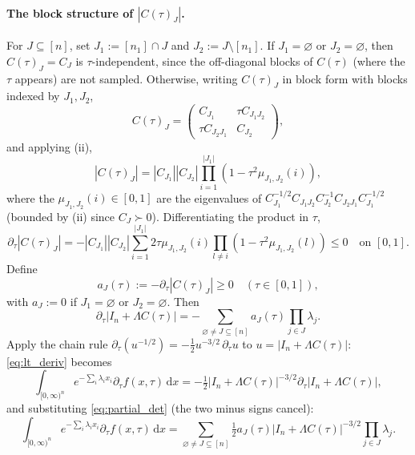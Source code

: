 \documentclass[14pt]{extarticle}
\theoremstyle{definition}
\newcommand{\dd}{\mathrm{d}}
\begin{document}
\paragraph{The block structure of $|C(\tau)_J|$.}  For $J\subseteq[n]$, set
$J_1:=[n_1]\cap J$ and $J_2:=J\setminus[n_1]$.  If $J_1=\varnothing$
or $J_2=\varnothing$, then $C(\tau)_J=C_J$ is $\tau$-independent,
since the off-diagonal blocks of $C(\tau)$ (where the $\tau$ appears)
are not sampled.  Otherwise, writing $C(\tau)_J$ in block form with
blocks indexed by $J_1,J_2$,
\[
  C(\tau)_J
  =\begin{pmatrix}C_{J_1}&\tau C_{J_1J_2}\\
    \tau C_{J_2J_1}&C_{J_2}\end{pmatrix},
\]
and applying (ii),
\begin{equation}\label{eq:CtauJ}
  |C(\tau)_J|
  =|C_{J_1}||C_{J_2}|\prod_{i=1}^{|J_1|}(1-\tau^2\mu_{J_1,J_2}(i)),
\end{equation}
where the $\mu_{J_1,J_2}(i)\in[0,1]$ are the eigenvalues of
$C_{J_1}^{-1/2}C_{J_1J_2}C_{J_2}^{-1}C_{J_2J_1}C_{J_1}^{-1/2}$
(bounded by (ii) since $C_J\succ 0$).
Differentiating the product in $\tau$,
\[
  \partial_\tau|C(\tau)_J|
  =-|C_{J_1}||C_{J_2}|\sum_{i=1}^{|J_1|}2\tau\mu_{J_1,J_2}(i)
  \prod_{l\ne i}(1-\tau^2\mu_{J_1,J_2}(l))
  \leqslant 0\quad\text{on }[0,1].
\]
Define
\begin{equation}\label{eq:aJ}
  a_J(\tau):=-\partial_\tau|C(\tau)_J|\geqslant 0
  \quad(\tau\in[0,1]),
\end{equation}
with $a_J:=0$ if $J_1=\varnothing$ or $J_2=\varnothing$.  Then
\begin{equation}\label{eq:partial_det}
  \partial_\tau|I_n+\Lambda C(\tau)|
  =-\sum_{\varnothing\ne J\subseteq[n]}a_J(\tau)\prod_{j\in J}\lambda_j.
\end{equation}
Apply the chain rule
$\partial_\tau(u^{-1/2})=-\tfrac12 u^{-3/2}\,\partial_\tau u$ to
$u=|I_n+\Lambda C(\tau)|$: \eqref{eq:lt_deriv} becomes
\[
  \int_{[0,\infty)^n}e^{-\sum_i\lambda_ix_i}
    \partial_\tau f(x,\tau)\,\dd x
  =-\tfrac12|I_n+\Lambda C(\tau)|^{-3/2}
    \partial_\tau|I_n+\Lambda C(\tau)|,
\]
and substituting \eqref{eq:partial_det} (the two minus signs cancel):
\begin{equation}\label{eq:lt_of_ftau}
  \int_{[0,\infty)^n}e^{-\sum_i\lambda_ix_i}
  \partial_\tau f(x,\tau)\,\dd x
  =\sum_{\varnothing\ne J\subseteq[n]}
  \tfrac{1}{2}a_J(\tau)|I_n+\Lambda C(\tau)|^{-3/2}
  \prod_{j\in J}\lambda_j.
\end{equation}
\end{document}
